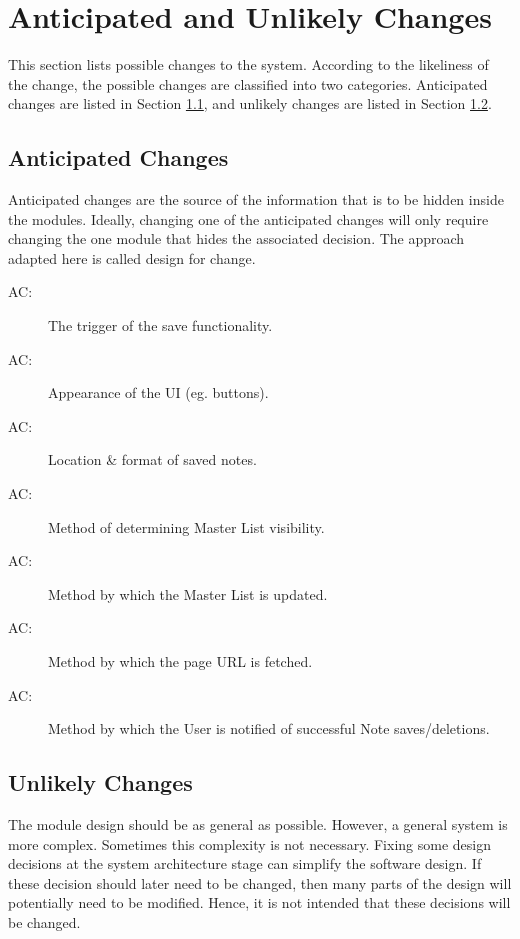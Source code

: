 \documentclass[12pt, titlepage]{article}
\newcounter{acnum}
\newcommand{\actheacnum}{AC\theacnum}
\begin{document}
\section{Anticipated and Unlikely Changes} \label{SecChange}

This section lists possible changes to the system. According to the likeliness
of the change, the possible changes are classified into two
categories. Anticipated changes are listed in Section \ref{SecAchange}, and
unlikely changes are listed in Section \ref{SecUchange}.

\subsection{Anticipated Changes} \label{SecAchange}

Anticipated changes are the source of the information that is to be hidden
inside the modules. Ideally, changing one of the anticipated changes will only
require changing the one module that hides the associated decision. The approach
adapted here is called design for
change.

\begin{description}
\item[ \actheacnum \label{acTrigger}:] The trigger of 
the save functionality.
\item[ \actheacnum \label{acUI}:] Appearance of the UI 
(eg. buttons).
\item[ \actheacnum \label{acSave}:] Location \& format of 
saved notes.
\item[ \actheacnum \label{acVisibility}:] Method of 
determining Master List visibility.
\item[ \actheacnum \label{acUpdate}:] Method by which the 
Master List is updated.
\item[ \actheacnum \label{acURL}:] Method by which the 
page URL is fetched.
\item[ \actheacnum \label{acNotify}:] Method by which the 
User is notified of successful Note saves/deletions.
\end{description}

\subsection{Unlikely Changes} \label{SecUchange}

The module design should be as general as possible. However, a general system is
more complex. Sometimes this complexity is not necessary. Fixing some design
decisions at the system architecture stage can simplify the software design. If
these decision should later need to be changed, then many parts of the design
will potentially need to be modified. Hence, it is not intended that these
decisions will be changed.
\end{document}
